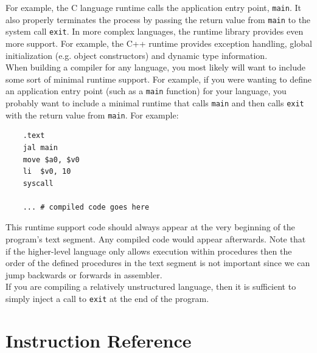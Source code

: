 \documentclass[12pt]{article}
\begin{document}
For example, the C language runtime calls the application entry point,
     \texttt{main}. It also properly terminates the process by passing the
     return value from \texttt{main} to the system call \texttt{exit}. In more
     complex languages, the runtime library provides even more support. For
     example, the C++ runtime provides exception handling, global initialization
     (e.g. object constructors) and dynamic type information.\\

When building a compiler for any language, you most likely will want to include
     some sort of minimal runtime support. For example, if you were wanting to
     define an application entry point (such as a \texttt{main} function) for
     your language, you probably want to include a minimal runtime that calls
     \texttt{main} and then calls \texttt{exit} with the return value from
     \texttt{main}. For example:\\

\begin{lstlisting}
    .text
    jal main
    move $a0, $v0
    li  $v0, 10
    syscall

    ... # compiled code goes here
\end{lstlisting}

This runtime support code should always appear at the very beginning of the
     program's text segment. Any compiled code would appear afterwards. Note
     that if the higher-level language only allows execution within procedures
     then the order of the defined procedures in the text segment is not
     important since we can jump backwards or forwards in assembler.\\

If you are compiling a relatively unstructured language, then it is sufficient
     to simply inject a call to \texttt{exit} at the end of the program.

\newpage
\section{Instruction Reference}
\label{sec:iref}
\end{document}
